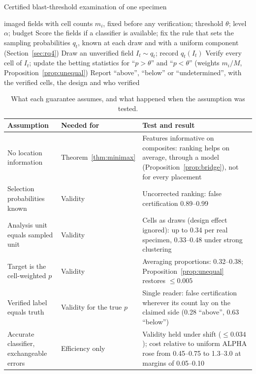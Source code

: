 \documentclass[journal]{IEEEtran}
\begin{document}
\begin{algorithm}[t]
\caption{Certified blast-threshold examination of one specimen}\label{alg:cert}
\small
\begin{algorithmic}[1]
\Require imaged fields with cell counts $m_i$, fixed before any verification; threshold $\theta$; level $\alpha$; budget
\State Score the fields if a classifier is available; fix the rule that sets the sampling probabilities $q_t$, known at each draw and with a uniform component (Section~\ref{sec:rq4})
\Repeat
\State Draw an unverified field $I_t\sim q_t$; record $q_t(I_t)$
\State Verify every cell of $I_t$; update the betting statistics for ``$p>\theta$'' and ``$p<\theta$'' (weights $m_i/M$, Proposition~\ref{prop:unequal})
\State Report ``above'', ``below'' or ``undetermined'', with the verified cells, the design and who verified
\end{algorithmic}
\end{algorithm}

\begin{table}[t]
\centering\footnotesize
\caption{What each guarantee assumes, and what happened when the assumption was tested.}\label{tab:assump}
\begin{tabular}{@{}L{4.2cm}L{2.6cm}L{7.4cm}@{}}
\toprule
Assumption & Needed for & Test and result\\
\midrule
No location information & Theorem~\ref{thm:minimax} & Features informative on composites: ranking helps on average, through a model (Proposition~\ref{prop:bridge}), not for every placement\\
Selection probabilities known & Validity & Uncorrected ranking: false certification 0.89--0.99\\
Analysis unit equals sampled unit & Validity & Cells as draws (design effect ignored): up to 0.34 per real specimen, 0.33--0.48 under strong clustering\\
Target is the cell-weighted $p$ & Validity & Averaging proportions: 0.32--0.38; Proposition~\ref{prop:unequal} restores $\le0.005$\\
Verified label equals truth & Validity for the true $p$ & Single reader: false certification wherever its count lay on the claimed side (0.28 ``above'', 0.63 ``below'')\\
Accurate classifier, exchangeable errors & Efficiency only & Validity held under shift ($\le0.034$); cost relative to uniform ALPHA rose from 0.45--0.75 to 1.3--3.0 at margins of 0.05--0.10\\
\bottomrule
\end{tabular}
\end{table}
\end{document}
